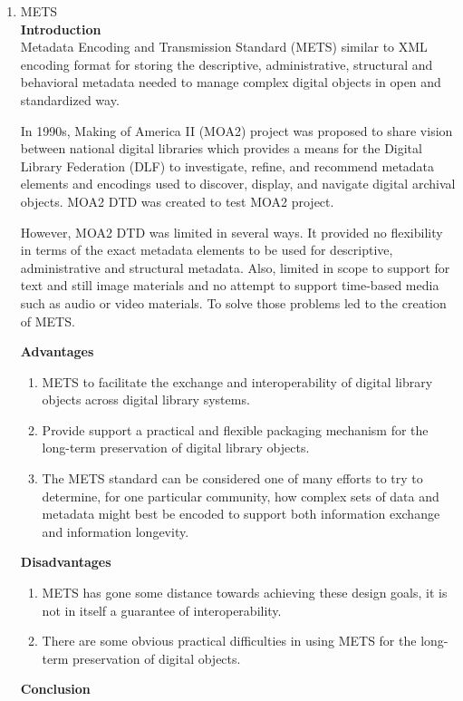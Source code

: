 \begin{enumerate}
	\item METS\\
	{\bf Introduction}\\
	Metadata Encoding and Transmission Standard (METS) similar to XML encoding format for storing the descriptive, administrative, structural and behavioral metadata needed to manage complex digital objects in open and standardized way.
	
	In 1990s, Making of America II (MOA2) project was proposed to share vision between national digital libraries which provides a means for the Digital Library Federation (DLF) to investigate, refine, and recommend metadata elements and encodings used to discover, display, and navigate digital archival objects. MOA2 DTD was created to test MOA2 project.
	
	However, MOA2 DTD was limited in several ways. It provided no flexibility in terms of the exact metadata elements to be used for descriptive, administrative and structural metadata. Also, limited in scope to support for text and still image materials and no attempt to support time-based media such as audio or video materials. To solve those problems led to the creation of METS.
	
	{\bf Advantages}
	\begin{enumerate}
		\item METS to facilitate the exchange and interoperability of digital library objects across digital library systems.
		\item Provide support a practical and flexible packaging mechanism for the long-term preservation of digital library objects.
		\item The METS standard can be considered one of many efforts to try to determine, for one particular community, how complex sets of data and metadata might best be encoded to support both information exchange and information longevity.
	\end{enumerate}	
	{\bf Disadvantages}
	\begin{enumerate}
		\item METS has gone some distance towards achieving these design goals, it is not in itself a guarantee of interoperability.
		\item There are some obvious practical difficulties in using METS for the long-term preservation of digital objects.
	\end{enumerate}
	{\bf Conclusion}\\	
	

\end{enumerate}
